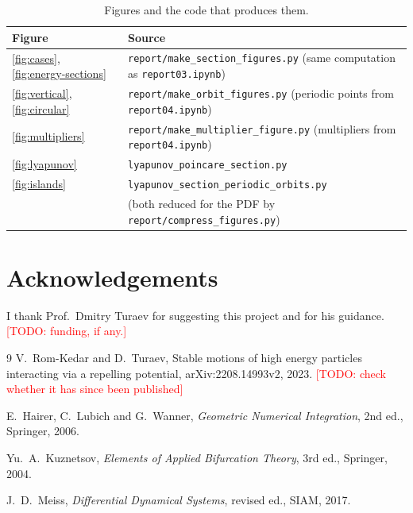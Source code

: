 \documentclass[11pt,a4paper]{article}
\newcommand{\todo}[1]{\textcolor{red}{[TODO: #1]}}
\begin{document}
\begin{table}[H]
\centering
\caption{Figures and the code that produces them.}
\label{tab:repro}
\begin{tabular}{@{}ll@{}}
\toprule
Figure & Source\\
\midrule
\ref{fig:cases}, \ref{fig:energy-sections} & \texttt{report/make\_section\_figures.py} (same computation as \texttt{report03.ipynb})\\
\ref{fig:vertical}, \ref{fig:circular} & \texttt{report/make\_orbit\_figures.py} (periodic points from \texttt{report04.ipynb})\\
\ref{fig:multipliers} & \texttt{report/make\_multiplier\_figure.py} (multipliers from \texttt{report04.ipynb})\\
\ref{fig:lyapunov} & \texttt{lyapunov\_poincare\_section.py}\\
\ref{fig:islands} & \texttt{lyapunov\_section\_periodic\_orbits.py}\\
& (both reduced for the PDF by \texttt{report/compress\_figures.py})\\
\bottomrule
\end{tabular}
\end{table}

\section*{Acknowledgements}
I thank Prof.\ Dmitry Turaev for suggesting this project and for his guidance.
\todo{funding, if any.}

\begin{thebibliography}{9}
V.~Rom-Kedar and D.~Turaev,
Stable motions of high energy particles interacting via a repelling potential,
arXiv:2208.14993v2, 2023. \todo{check whether it has since been published}

E.~Hairer, C.~Lubich and G.~Wanner,
\emph{Geometric Numerical Integration}, 2nd ed., Springer, 2006.

Yu.~A.~Kuznetsov, \emph{Elements of Applied Bifurcation Theory}, 3rd ed.,
Springer, 2004.

J.~D.~Meiss, \emph{Differential Dynamical Systems}, revised ed., SIAM, 2017.
\end{thebibliography}
\end{document}
